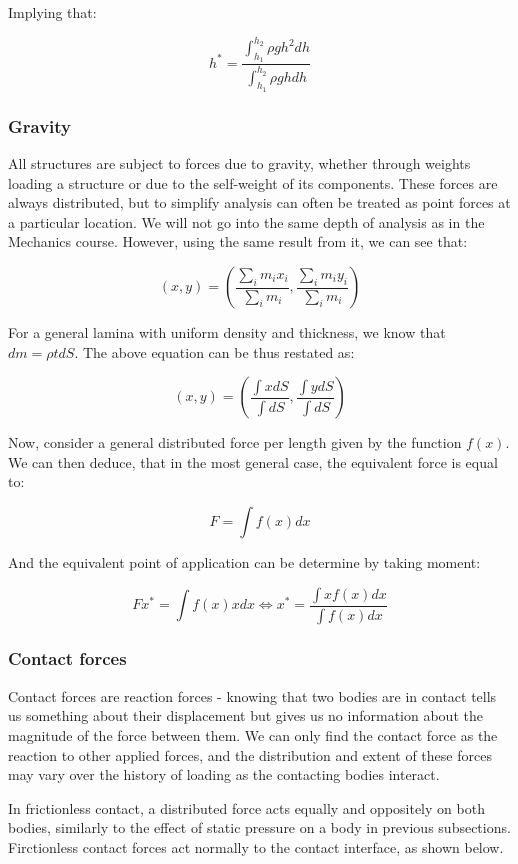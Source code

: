 \documentclass{article}
\begin{document}
Implying that:

\[ h^* = \frac{\int_{h_1}^{h_2} \rho gh^2dh}{\int_{h_1}^{h_2} \rho g h dh} \]

\subsubsection{Gravity}

All structures are subject to forces due to gravity, whether through weights loading a structure or due to the self-weight of its components. These forces are always distributed, but to simplify analysis can often be treated as point forces at a particular location. We will not go into the same depth of analysis as in the Mechanics course. However, using the same result from it, we can see that:

\[ (x, y) = \left(\frac{\sum_i m_ix_i}{\sum_i m_i}, \frac{\sum_i m_iy_i}{\sum_i m_i}\right) \]

For a general lamina with uniform density and thickness, we know that $dm = \rho t dS$. The above equation can be thus restated as:

\[ (x, y) = \left(\frac{\int xdS}{\int dS}, \frac{\int ydS}{\int dS}\right) \]

Now, consider a general distributed force per length given by the function $f(x)$. We can then deduce, that in the most general case, the equivalent force is equal to:

\[ F = \int f(x)dx \]

And the equivalent point of application can be determine by taking moment:

\[ Fx^* = \int f(x)xdx \iff x^* = \frac{\int xf(x)dx}{\int f(x)dx} \]

\subsubsection{Contact forces}

Contact forces are reaction forces - knowing that two bodies are in contact tells us something about their displacement but gives us no information about the magnitude of the force between them. We can only find the contact force as the reaction to other applied forces, and the distribution and extent of these forces may vary over the history of loading as the contacting bodies interact.

In frictionless contact, a distributed force acts equally and oppositely on both bodies, similarly to the effect of static pressure on a body in previous subsections. Firctionless contact forces act normally to the contact interface, as shown below.
\end{document}
